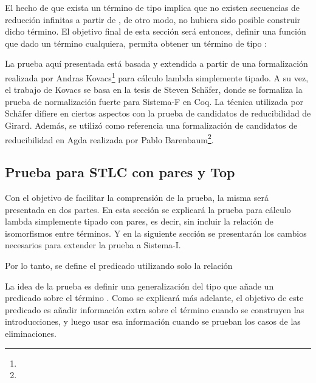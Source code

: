 El hecho de que exista un término de tipo   implica que no existen secuencias de reducción infinitas a partir de , de otro modo, no hubiera sido posible construir dicho término.
El objetivo final de esta sección será entonces, definir una función que dado un término cualquiera, permita obtener un término de tipo  :

\vspace{0.5em}
\AgdaSymbol{:}
\AgdaSymbol{\{}
\AgdaSymbol{\}}
\AgdaSymbol{(}
\AgdaSymbol{:}
\AgdaSymbol{)}
\vspace{0.5em}

La prueba aquí presentada está basada y extendida a partir de una formalización realizada por 
Andras Kovacs\footnote{} para cálculo lambda simplemente tipado.
A su vez, el trabajo de Kovacs se basa en la tesis de Steven Schäfer\cite{Schafer}, donde se formaliza la prueba de normalización fuerte para Sistema-F en Coq.
La técnica utilizada por Schäfer difiere en ciertos aspectos con la prueba de candidatos de reducibilidad de Girard\cite{Girard}.
Además, se utilizó como referencia una formalización de candidatos de reducibilidad en Agda realizada por Pablo Barenbaum\footnote{}.

\subsection{Prueba para STLC con pares y Top}

Con el objetivo de facilitar la comprensión de la prueba, la misma será presentada en dos partes.
En esta sección se explicará la prueba para cálculo lambda simplemente tipado con pares, es decir, sin incluir la relación de isomorfismos entre términos.
Y en la siguiente sección se presentarán los cambios necesarios para extender la prueba a Sistema-I.


Por lo tanto, se define el predicado  utilizando solo la relación \type{$\_\hookrightarrow\_$}


La idea de la prueba es definir una generalización del tipo  que añade un predicado sobre el término .
Como se explicará más adelante, el objetivo de este predicado es añadir información extra sobre el término cuando se construyen las introducciones, y luego usar esa información cuando se prueban los casos de las eliminaciones.

